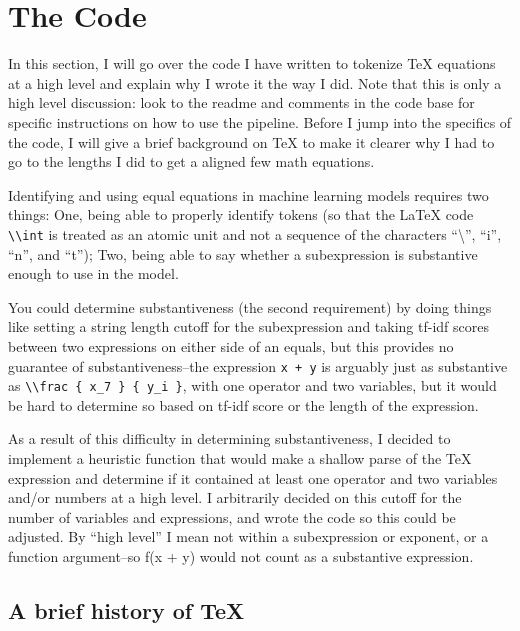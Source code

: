 \documentclass[]{article}
\begin{document}
\hypertarget{the-code}{%
\section{The Code}\label{the-code}}

In this section, I will go over the code I have written to tokenize TeX
equations at a high level and explain why I wrote it the way I did. Note
that this is only a high level discussion: look to the readme and
comments in the code base for specific instructions on how to use the
pipeline. Before I jump into the specifics of the code, I will give a
brief background on TeX to make it clearer why I had to go to the
lengths I did to get a aligned few math equations.

Identifying and using equal equations in machine learning models
requires two things: One, being able to properly identify tokens (so
that the LaTeX code \texttt{\textbackslash{}\textbackslash{}int} is
treated as an atomic unit and not a sequence of the characters
``\textbackslash{}'', ``i'', ``n'', and ``t''); Two, being able to say
whether a subexpression is substantive enough to use in the model.

You could determine substantiveness (the second requirement) by doing
things like setting a string length cutoff for the subexpression and
taking tf-idf scores between two expressions on either side of an
equals, but this provides no guarantee of substantiveness--the
expression \texttt{x\ +\ y} is arguably just as substantive as
\texttt{\textbackslash{}\textbackslash{}frac\ \{\ x\_7\ \}\ \{\ y\_i\ \}},
with one operator and two variables, but it would be hard to determine
so based on tf-idf score or the length of the expression.

As a result of this difficulty in determining substantiveness, I decided
to implement a heuristic function that would make a shallow parse of the
TeX expression and determine if it contained at least one operator and
two variables and/or numbers at a high level. I arbitrarily decided on
this cutoff for the number of variables and expressions, and wrote the
code so this could be adjusted. By ``high level'' I mean not within a
subexpression or exponent, or a function argument--so f(x + y) would not
count as a substantive expression.

\hypertarget{a-brief-history-of-tex}{%
\subsection{A brief history of TeX}\label{a-brief-history-of-tex}}
\end{document}
